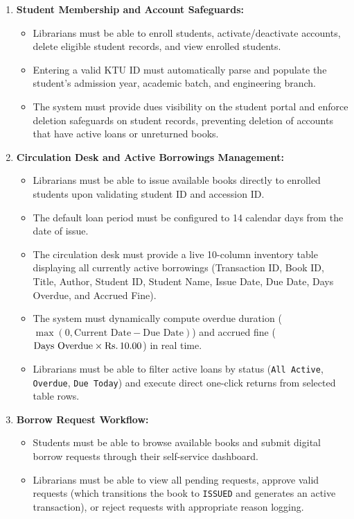 \begin{enumerate}[label=\textbf{FR-\arabic*:}, leftmargin=2.5cm]
    \item \textbf{Student Membership and Account Safeguards:}
    \begin{itemize}
        \item Librarians must be able to enroll students, activate/deactivate accounts, delete eligible student records, and view enrolled students.
        \item Entering a valid KTU ID must automatically parse and populate the student's admission year, academic batch, and engineering branch.
        \item The system must provide dues visibility on the student portal and enforce deletion safeguards on student records, preventing deletion of accounts that have active loans or unreturned books.
    \end{itemize}

    \item \textbf{Circulation Desk and Active Borrowings Management:}
    \begin{itemize}
        \item Librarians must be able to issue available books directly to enrolled students upon validating student ID and accession ID.
        \item The default loan period must be configured to 14 calendar days from the date of issue.
        \item The circulation desk must provide a live 10-column inventory table displaying all currently active borrowings (Transaction ID, Book ID, Title, Author, Student ID, Student Name, Issue Date, Due Date, Days Overdue, and Accrued Fine).
        \item The system must dynamically compute overdue duration ($\max(0, \text{Current Date} - \text{Due Date})$) and accrued fine ($\text{Days Overdue} \times \text{\text{Rs.\,}} 10.00$) in real time.
        \item Librarians must be able to filter active loans by status (\texttt{All Active}, \texttt{Overdue}, \texttt{Due Today}) and execute direct one-click returns from selected table rows.
    \end{itemize}

    \item \textbf{Borrow Request Workflow:}
    \begin{itemize}
        \item Students must be able to browse available books and submit digital borrow requests through their self-service dashboard.
        \item Librarians must be able to view all pending requests, approve valid requests (which transitions the book to \texttt{ISSUED} and generates an active transaction), or reject requests with appropriate reason logging.
    \end{itemize}


\end{enumerate}

